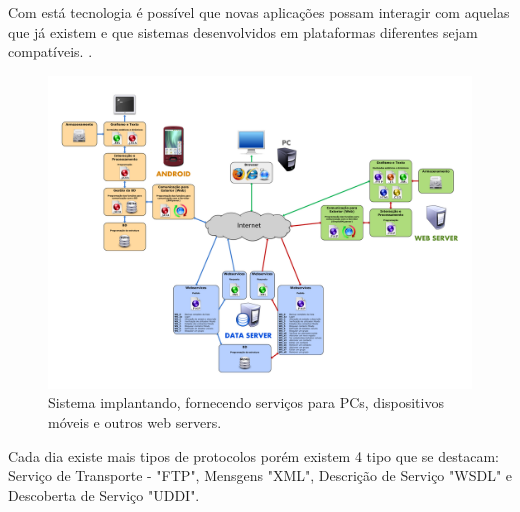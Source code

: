 \documentclass[12pt]{article}
\begin{document}
Com está tecnologia é possível que novas aplicações possam interagir com aquelas que já existem e que sistemas desenvolvidos em plataformas diferentes sejam compatíveis. 
 \cite{webservece}.
\begin{figure}[H]
	\centering
	\includegraphics[scale=0.14]{Imagens/webservice.png}
	\caption{Sistema implantando, fornecendo serviços para PCs, dispositivos móveis e outros web servers.}
	\label{wbs}
\end{figure} 

Cada dia existe mais tipos de protocolos porém existem 4 tipo que se destacam: Serviço de Transporte - "FTP", Mensgens "XML", Descrição de Serviço "WSDL"  e Descoberta de Serviço "UDDI".
\end{document}
